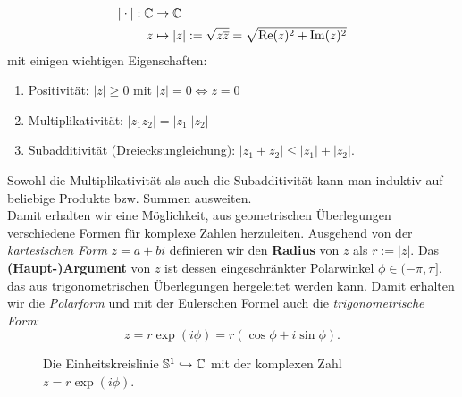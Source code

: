 \begin{equation}
\begin{split}
|\cdot |: \mathbb{C} &\to \mathbb{C}\\
z &\mapsto |z| := \sqrt{z \overline{z}} = \sqrt{\Re(z)^2+\Im(z)^2}
\end{split}
\end{equation}
mit einigen wichtigen Eigenschaften:
\begin{enumerate}[({M}1)]
\item Positivität: $|z| \geq 0$ mit $|z| = 0 \iff z=0$
\item Multiplikativität: $|z_1z_2| = |z_1||z_2|$
\item Subadditivität (Dreiecksungleichung): $|z_1+z_2| \leq |z_1| + |z_2|$.
\end{enumerate}
Sowohl die Multiplikativität als auch die Subadditivität kann man induktiv auf beliebige  Produkte bzw. Summen ausweiten.\\
Damit erhalten wir eine Möglichkeit, aus geometrischen Überlegungen verschiedene Formen für komplexe Zahlen herzuleiten. Ausgehend von der \textit{kartesischen Form} $z=a+bi$ definieren wir den \textbf{Radius} von $z$ als $r := |z|$. Das \textbf{(Haupt-)Argument} von $z$ ist dessen eingeschränkter Polarwinkel $\phi \in (-\pi, \pi]$, das aus trigonometrischen Überlegungen hergeleitet werden kann. Damit erhalten wir die \textit{Polarform} und mit der Eulerschen Formel auch die \textit{trigonometrische Form}:
\begin{equation}
z = r \exp(i\phi) = r(\cos \phi + i \sin \phi).
\end{equation} 
\begin{figure}[H]
\centering
{}
\caption{Die Einheitskreislinie $\mathbb{S}^1 \hookrightarrow \mathbb{C}$ mit der komplexen Zahl $z=r\exp(i\phi)$.}
\end{figure}
